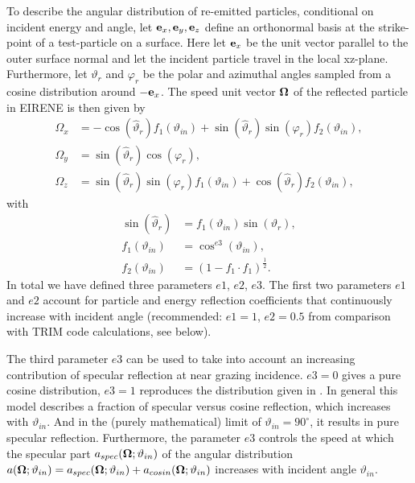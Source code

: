 To describe the angular distribution of re-emitted particles, conditional on
incident energy and angle,  let $ \mathbf{e}_x,   \mathbf{e}_y,   \mathbf{e}_z$ define an
orthonormal basis at the strike-point of a test-particle on a surface.
Here let $ \mathbf{e}_x$ be the unit vector parallel to the outer surface normal and
let the incident particle travel in the local xz-plane.
Furthermore, let $ \vartheta_r$ and $ \varphi_r$ be the polar and azimuthal
angles sampled from a cosine distribution around $ - \mathbf{e}_x$.
The speed unit vector $ \mathbf{\Omega} $ of the reflected particle in EIRENE is then
given by
\begin{align}
  \Omega_x & = - \cos( \hat{\vartheta}_r ) f_1 (
  \vartheta_{in} )   +	    \sin( \hat{\vartheta}_r ) \sin( \varphi_r)	 f_2 (
  \vartheta_{in} ),     \nonumber                          \\
  \Omega_y & = \sin( \hat{\vartheta}_r )
  \cos( \varphi_r ),			       \nonumber
  \\
  \Omega_z & = \sin( \hat{\vartheta}_r ) \sin( \varphi_r )
  f_1( \vartheta_{in} )   + \cos( \hat{\vartheta}_r )	f_2(
  \vartheta_{in} ), \label{eq1.21}
\end{align}
with
\begin{align}
  \sin( \hat{\vartheta}_r ) & = f_1( \vartheta
  _{in})   \sin( \vartheta_r ), \nonumber      \\
  f_1( \vartheta_{in} )     & = \cos^{e3}
  ( \vartheta_{in} ), \nonumber                \\
  f_2( \vartheta_{in} )     & =
  (   1   -   f_1  \cdot f_1 )^{\frac{1}{2}} . \nonumber
\end{align}
In total we have defined three parameters $e1$, $e2$, $e3$.
The first two parameters $e1$ and $e2$ account for particle and energy
reflection coefficients that continuously increase with incident angle
(recommended: $e1=1$, $e2=0.5$ from comparison with TRIM code calculations, see
below).

The third parameter $e3$ can be used to take into account an increasing
contribution of specular reflection at near grazing incidence.
$e3=0$ gives a pure cosine distribution, $e3=1$ reproduces the distribution
given in \cite{kn:Heifetz}.
In general this model describes a fraction of specular versus cosine
reflection, which increases with $ \vartheta_{in}$.
And in the (purely mathematical) limit of $ \vartheta_{in} = 90^{\circ}$, it
results in pure specular reflection.
Furthermore, the parameter $e3$ controls the speed at which the specular part
$a_{spec} ( \mathbf{\Omega}; \vartheta_{in})$ of the angular distribution $a (\mathbf{\Omega};
  \vartheta_{in}) = a_{spec} ( \mathbf{\Omega}; \vartheta_{in}) +   a_{cosin} ( \mathbf{\Omega};
  \vartheta_{in})$ increases with incident angle $ \vartheta_{in} $.


